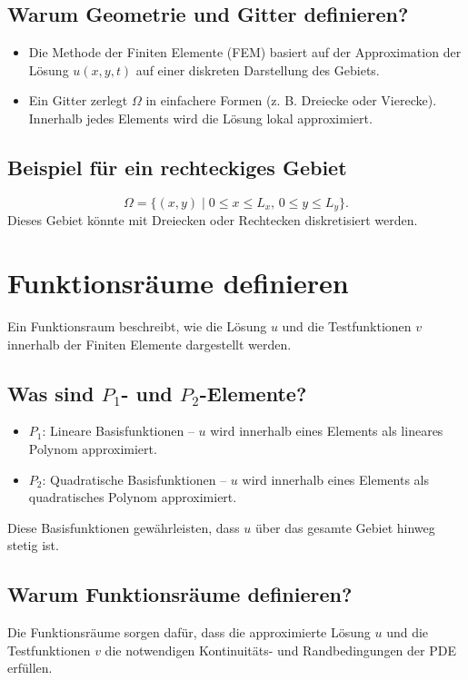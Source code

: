 \subsection{Warum Geometrie und Gitter definieren?}
\begin{itemize}
	\item Die Methode der Finiten Elemente (FEM) basiert auf der Approximation der Lösung $u(x, y, t)$ auf einer diskreten Darstellung des Gebiets.
	\item Ein Gitter zerlegt $\Omega$ in einfachere Formen (z. B. Dreiecke oder Vierecke). Innerhalb jedes Elements wird die Lösung lokal approximiert.
\end{itemize}

\subsection{Beispiel für ein rechteckiges Gebiet}
\begin{equation}
	\Omega = \{(x, y) \mid 0 \leq x \leq L_x, \, 0 \leq y \leq L_y\}.
\end{equation}
Dieses Gebiet könnte mit Dreiecken oder Rechtecken diskretisiert werden.

\section{Funktionsräume definieren}
Ein Funktionsraum beschreibt, wie die Lösung $u$ und die Testfunktionen $v$ innerhalb der Finiten Elemente dargestellt werden.

\subsection{Was sind $P_1$- und $P_2$-Elemente?}
\begin{itemize}
	\item $P_1$: Lineare Basisfunktionen – $u$ wird innerhalb eines Elements als lineares Polynom approximiert.
	\item $P_2$: Quadratische Basisfunktionen – $u$ wird innerhalb eines Elements als quadratisches Polynom approximiert.
\end{itemize}
Diese Basisfunktionen gewährleisten, dass $u$ über das gesamte Gebiet hinweg stetig ist.

\subsection{Warum Funktionsräume definieren?}
Die Funktionsräume sorgen dafür, dass die approximierte Lösung $u$ und die Testfunktionen $v$ die notwendigen Kontinuitäts- und Randbedingungen der PDE erfüllen.

